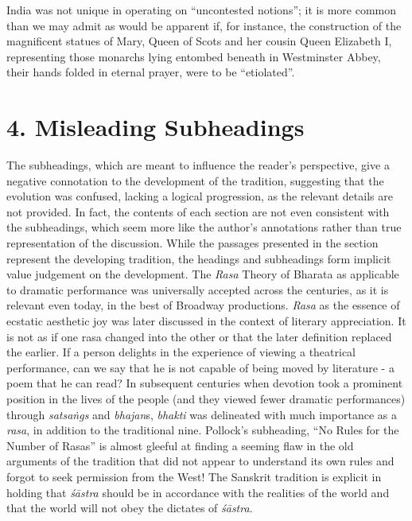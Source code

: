India was not unique in operating on “uncontested notions”; it is more common than we may admit as would be apparent if, for instance, the construction of the magnificent statues of Mary, Queen of Scots and her cousin Queen Elizabeth I, representing those monarchs lying entombed beneath in Westminster Abbey, their hands folded in eternal prayer, were to be “etiolated”.


\section*{4. Misleading Subheadings}

The subheadings, which are meant to influence the reader’s perspective, give a negative connotation to the development of the tradition, suggesting that the evolution was confused, lacking a logical progression, as the relevant details are not provided. In fact, the contents of each section are not even consistent with the subheadings, which seem more like the author’s annotations rather than true representation of the discussion. While the passages presented in the section represent the developing tradition, the headings and subheadings form implicit value judgement on the development. The \textit{Rasa} Theory of Bharata as applicable to dramatic performance was universally accep\-ted across the centuries, as it is relevant even today, in the best of Broadway productions. \textit{Rasa} as the essence of ecstatic aesthetic joy was later discussed in the context of literary appreciation. It is not as if one rasa changed into the other or that the later definition replaced the earlier. If a person delights in the experience of viewing a theatrical performance, can we say that he is not capable of being moved by literature - a poem that he can read? In subsequent centuries when devotion took a prominent position in the lives of the people (and they viewed fewer dramatic performances) through \textit{satsaṅgs} and \textit{bhajan}s, \textit{bhakti} was delineated with much importance as a \textit{rasa}, in addition to the traditional nine. Pollock’s subheading, “No Rules for the Number of Rasas” is almost gleeful at finding a seeming flaw in the old arguments of the tradition that did not appear to understand its own rules and forgot to seek permission from the West! The Sanskrit tradition is explicit in holding that \textit{śāstra} should be in accordance with the realities of the world and that the world will not obey the dictates of \textit{śāstra}.

